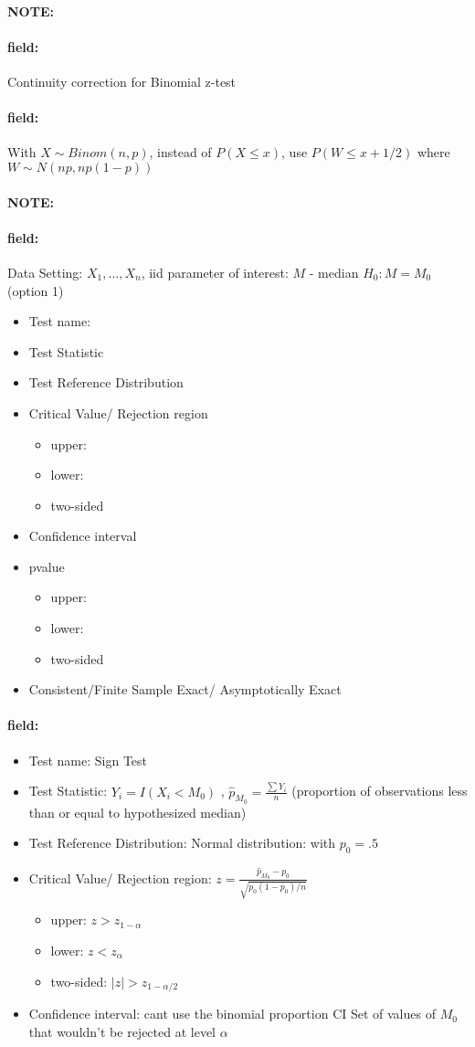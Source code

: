 \documentclass[12pt]{article}
\newenvironment{note}{\paragraph{NOTE:}}{}
\newenvironment{field}{\paragraph{field:}}{}
\begin{document}
\begin{note}
 \begin{field}
  Continuity correction for Binomial z-test
 \end{field}
 \begin{field}
  With $X \sim Binom(n,p)$, instead of $P(X \leq x)$, use $P(W \leq x + 1/2)$ where $W \sim N(np,np(1-p))$
 \end{field}
\end{note}


\begin{note}
 \begin{field}
  Data Setting: $X_1, \ldots, X_n$, iid parameter of interest: $M$ - median $H_0: M = M_0$ (option 1)
  \begin{itemize}
   \item Test name:
   \item Test Statistic
   \item Test Reference Distribution
   \item Critical Value/ Rejection region
         \begin{itemize}
          \item upper:
          \item lower:
          \item two-sided
         \end{itemize}
   \item Confidence interval
   \item pvalue
         \begin{itemize}
          \item upper:
          \item lower:
          \item two-sided
         \end{itemize}
   \item Consistent/Finite Sample Exact/ Asymptotically Exact
  \end{itemize}
 \end{field}
 \begin{field}
  \begin{itemize}
   \item Test name: Sign Test
   \item Test Statistic: $Y_i = I(X_i < M_0)$ , $\hat{p}_{M_0} = \frac{\sum Y_i}{n}$ (proportion of observations less than or equal to hypothesized median)
   \item Test Reference Distribution: Normal distribution: with $p_0 = .5$
   \item Critical Value/ Rejection region: $z = \frac{\hat{p}_{M_0} - p_0}{\sqrt{p_0(1-p_0)/n}}$
         \begin{itemize}
          \item upper: $z > z_{1-\alpha}$
          \item lower: $z < z_\alpha$
          \item two-sided: $|z| > z_{1-\alpha/2}$
         \end{itemize}
   \item Confidence interval: cant use the binomial proportion CI
         Set of values of $M_0$ that wouldn't be rejected at level $\alpha$


\end{itemize}
\end{field}
\end{note}
\end{document}
